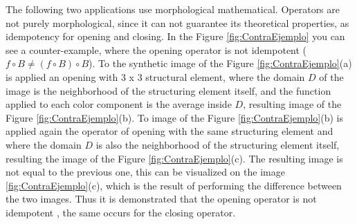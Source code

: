 The following two applications use morphological mathematical. Operators are not purely morphological, since it can not guarantee its theoretical properties, as idempotency for opening and closing. In the Figure \ref{fig:ContraEjemplo} you can see a counter-example, where the opening operator is not  idempotent ($f\circ B \neq (f\circ B) \circ B$). To the synthetic image of the Figure \ref{fig:ContraEjemplo}(a) is applied an opening with 3 x 3 structural element, where the domain $D$ of the image is the neighborhood of the structuring element itself, and the function applied to each color component is the average inside $D$, resulting image of the Figure \ref{fig:ContraEjemplo}(b). To image of the Figure  \ref{fig:ContraEjemplo}(b) is applied again the operator of opening with the same structuring element and where the domain $D$ is also the neighborhood of the structuring element itself, resulting the image of the Figure \ref{fig:ContraEjemplo}(c). The resulting image is not equal to the previous one, this can be visualized on the image \ref{fig:ContraEjemplo}(c), which is the result of performing the difference between the two images. Thus it is demonstrated that the opening operator is not idempotent , the same occurs for the closing operator.


\begin{figure*}
	\\
	\caption{A counter-example shows that openness is not idempotent with the ordering proposed.}	
	\label{fig:ContraEjemplo}
\end{figure*}


